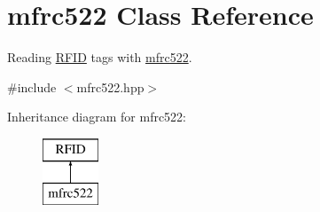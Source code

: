 \hypertarget{classmfrc522}{}\section{mfrc522 Class Reference}
\label{classmfrc522}


Reading \hyperlink{class_r_f_i_d}{R\+F\+ID} tags with \hyperlink{classmfrc522}{mfrc522}.  




{\ttfamily \#include $<$mfrc522.\+hpp$>$}

Inheritance diagram for mfrc522\+:\begin{figure}[H]
\begin{center}
\leavevmode
\includegraphics[height=2.000000cm]{classmfrc522}
\end{center}
\end{figure}
